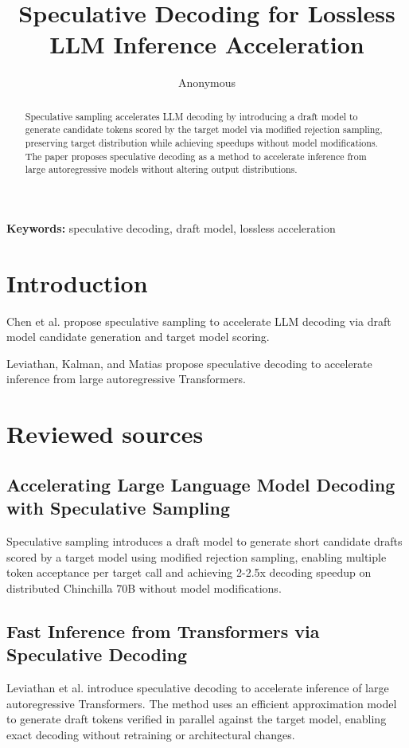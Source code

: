 \documentclass{article}\usepackage{amsmath,amssymb,graphicx,url}
\title{Speculative Decoding for Lossless LLM Inference Acceleration}
\author{Anonymous}
\begin{document}
\maketitle
\begin{abstract}
Speculative sampling accelerates LLM decoding by introducing a draft model to generate candidate tokens scored by the target model via modified rejection sampling, preserving target distribution while achieving speedups without model modifications. \cite{chen2023accelerating} The paper proposes speculative decoding as a method to accelerate inference from large autoregressive models without altering output distributions. \cite{leviathan2022fast}
\end{abstract}
\noindent\textbf{Keywords:} speculative decoding, draft model, lossless acceleration




\section{Introduction}
Chen et al. propose speculative sampling to accelerate LLM decoding via draft model candidate generation and target model scoring. \cite{chen2023accelerating}

Leviathan, Kalman, and Matias propose speculative decoding to accelerate inference from large autoregressive Transformers. \cite{leviathan2022fast}

\section{Reviewed sources}
\subsection{Accelerating Large Language Model Decoding with Speculative Sampling}
Speculative sampling introduces a draft model to generate short candidate drafts scored by a target model using modified rejection sampling, enabling multiple token acceptance per target call and achieving 2-2.5x decoding speedup on distributed Chinchilla 70B without model modifications. \cite{chen2023accelerating}

\subsection{Fast Inference from Transformers via Speculative Decoding}
Leviathan et al. introduce speculative decoding to accelerate inference of large autoregressive Transformers. The method uses an efficient approximation model to generate draft tokens verified in parallel against the target model, enabling exact decoding without retraining or architectural changes. \cite{leviathan2022fast}
\end{document}
